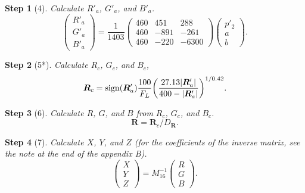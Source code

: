 \documentclass[twocolumn]{scrartcl}
\theoremstyle{named}
\newtheorem*{step}{Step}
\DeclarePairedDelimiter\abs{\lvert}{\rvert}%
\DeclareMathOperator{\sign}{sign}
\newcommand\rgb{\bm{R}}
\begin{document}
\begin{step}[4]
  Calculate $R'_a$, $G'_a$, and $B'_a$.
  \[
  \begin{pmatrix}
    R'_a\\G'_a\\B'_a
  \end{pmatrix}
  =
  \frac{1}{1403}
  \begin{pmatrix}
    460 & 451 & 288\\
    460 & -891 & -261\\
    460 & -220 & -6300
  \end{pmatrix}
  \begin{pmatrix}
    p'_2\\a\\b
  \end{pmatrix}.
  \]%
\end{step}

\begin{step}[5*]
Calculate $R_c$, $G_c$, and $B_c$,
  \[
  \rgb_c = \sign(\rgb'_a)
  \frac{100}{F_L} {\left(
    \frac{27.13 \abs{\rgb'_a}}{400 - \abs{\rgb'_a}}
    \right)}^{1/0.42}.
  \]
\end{step}

\begin{step}[6]
Calculate $R$, $G$, and $B$ from $R_c$, $G_c$, and $B_c$.
\[
  \rgb = \rgb_c / D_{\rgb}.
\]
\end{step}

\begin{step}[7]
Calculate $X$, $Y$, and $Z$ (for the coefficients of the inverse matrix, see
the note at the end of the appendix B).  %
\[
\begin{pmatrix}X\\Y\\Z\end{pmatrix}
  = M_{16}^{-1}
\begin{pmatrix}R\\G\\B\end{pmatrix}.
\]
\end{step}

\printbibliography{}
\end{document}
